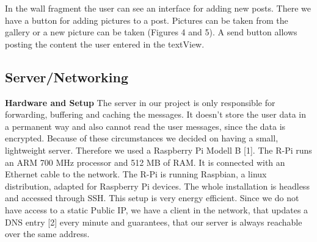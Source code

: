 \documentclass{report}
\begin{document}
In the wall fragment the user can see an interface for adding new posts. There we have a button for adding pictures to a post. Pictures can be taken from the gallery or a new picture can be taken (Figures 4 and 5). A send button allows posting the content the user entered in the textView. \begin{figure}[H]
	\centering
	\hfill
	\hfill
	
\end{figure}

\subsection{Server/Networking}
\textbf{Hardware and Setup}\newline
\indent The server in our project is only responsible for forwarding, buffering and caching the messages. It doesn't store the user data in a permanent way and also cannot read the user messages, since the data is encrypted. 
Because of these circumstances we decided on having a small, lightweight server. Therefore we used a Raspberry Pi Modell B [1]. The R-Pi runs an ARM 700 MHz processor and 512 MB of RAM. It is connected with an Ethernet cable to the network.
The R-Pi is running Raspbian, a linux distribution, adapted for Raspberry Pi devices. The whole installation is headless and accessed through SSH. This setup is very energy efficient. 
Since we do not have access to a static Public IP, we have a client in the network, that updates a DNS entry [2] every minute and guarantees, that our server is always reachable over the same address. 
\end{document}
